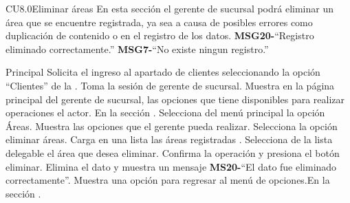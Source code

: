 

	\begin{UseCase}{CU8.0}{Eliminar áreas}{
		En esta sección el gerente de sucursal podrá eliminar un área que se encuentre registrada, ya sea a causa de posibles errores como duplicación de contenido o en el registro de los datos.
	}
		{
		{\bf MSG20-}``Registro eliminado correctamente.''		
		{\bf MSG7-}``No existe ningun registro.'' }

	\end{UseCase}

\begin{UCtrayectoria}{Principal}
		\UCpaso[\UCactor] Solicita el ingreso al apartado de clientes seleccionando la opción ``Clientes'' de la .
		\UCpaso Toma la sesión de gerente de sucursal.
		\UCpaso Muestra en la página principal del gerente de sucursal, las opciones que tiene disponibles para realizar operaciones el actor. En la sección .
		\UCpaso[\UCactor] Selecciona del menú principal la opción Áreas.
		\UCpaso Muestra las opciones que el gerente pueda realizar. 
		\UCpaso[\UCactor] Selecciona la opción eliminar áreas.
		\UCpaso Carga en una lista las áreas registradas .
		\UCpaso[\UCactor] Selecciona de la lista delegable el área que desea eliminar. 
		\UCpaso[\UCactor] Confirma la operación y presiona el botón eliminar.
		\UCpaso Elimina el dato y muestra un mensaje {\bf MS20-}``El dato fue eliminado correctamente''.
		\UCpaso Muestra una opción para regresar al menú de opciones.En la sección . 
	\end{UCtrayectoria}

